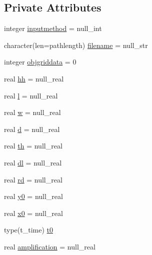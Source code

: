 \subsection*{Private Attributes}
\begin{DoxyCompactItemize}
\item 
integer \mbox{\hyperlink{structmodulehydrodynamic_1_1t__fault_a6b5efad51c1a5480e438a1fa42d7d612}{inputmethod}} = null\+\_\+int
\item 
character(len=pathlength) \mbox{\hyperlink{structmodulehydrodynamic_1_1t__fault_aea393bd37a291e44a0b6abd050a9612f}{filename}} = null\+\_\+str
\item 
integer \mbox{\hyperlink{structmodulehydrodynamic_1_1t__fault_ae62bbe4836ffbf64543d826d7b33aea3}{objgriddata}} = 0
\item 
real \mbox{\hyperlink{structmodulehydrodynamic_1_1t__fault_adf6f2d7e5d6fd19f1c5bf8fdbebc18f5}{hh}} = null\+\_\+real
\item 
real \mbox{\hyperlink{structmodulehydrodynamic_1_1t__fault_a6680c1c0937a2848a83038a64782a017}{l}} = null\+\_\+real
\item 
real \mbox{\hyperlink{structmodulehydrodynamic_1_1t__fault_ad5cd069c5e8d0058e05a819ac098c65a}{w}} = null\+\_\+real
\item 
real \mbox{\hyperlink{structmodulehydrodynamic_1_1t__fault_ad43a94e38541950d06b7bb5f2f24f970}{d}} = null\+\_\+real
\item 
real \mbox{\hyperlink{structmodulehydrodynamic_1_1t__fault_a798ff5e71d337b49d8d5b052e89811ca}{th}} = null\+\_\+real
\item 
real \mbox{\hyperlink{structmodulehydrodynamic_1_1t__fault_ab969a341c991dd38ef4b9ad4cd442bed}{dl}} = null\+\_\+real
\item 
real \mbox{\hyperlink{structmodulehydrodynamic_1_1t__fault_afdb3cc7ee20e4438e063d408e304d257}{rd}} = null\+\_\+real
\item 
real \mbox{\hyperlink{structmodulehydrodynamic_1_1t__fault_abaf6cdee1e6abf3634bc631fc381a177}{y0}} = null\+\_\+real
\item 
real \mbox{\hyperlink{structmodulehydrodynamic_1_1t__fault_ae3b10a90d2815a31fbdfcdd1290dba12}{x0}} = null\+\_\+real
\item 
type(t\+\_\+time) \mbox{\hyperlink{structmodulehydrodynamic_1_1t__fault_afcf20a9d2113d85c5d818ae89dc56982}{t0}}
\item 
real \mbox{\hyperlink{structmodulehydrodynamic_1_1t__fault_a8636d89127760051cc9f81b6abc7d0b2}{amplification}} = null\+\_\+real
\end{DoxyCompactItemize}


